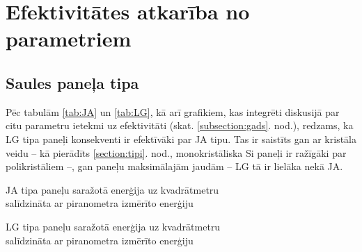 \section{Efektivitātes atkarība no parametriem}
\subsection{Saules paneļa tipa} \label{subsection:tipi}

Pēc tabulām \ref{tab:JA} un \ref{tab:LG}, kā arī grafikiem, kas integrēti diskusijā par citu parametru ietekmi uz efektivitāti (skat. \ref{subsection:gads}. nod.), redzams, ka LG tipa paneļi konsekventi ir efektīvāki par JA tipu. Tas ir saistīts gan ar kristāla veidu -- kā pierādīts \ref{section:tipi}. nod.,  monokristāliska Si paneļi ir ražīgāki par polikristāliem --, gan paneļu maksimālajām jaudām -- LG tā ir lielāka nekā JA.

\begin{table}[h]
    \caption{JA tipa paneļu saražotā enerģija uz kvadrātmetru\\ salīdzināta ar piranometra izmērīto enerģiju}
    \begin{center}
    
    \end{center} \label{tab:JA}
\end{table}
\begin{table}[h]
    \caption{LG tipa paneļu saražotā enerģija uz kvadrātmetru\\ salīdzināta ar piranometra izmērīto enerģiju}
    \begin{center}
    
    \end{center} \label{tab:LG}
\end{table}

